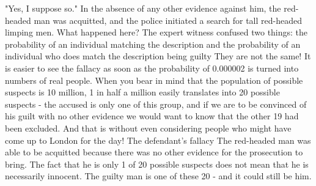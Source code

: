 "Yes, I suppose so."
In the absence of any other evidence against him, the red-headed man was acquitted, and the police initiated a search for tall red-headed limping men.
What happened here?
The expert witness confused two things:
the probability of an individual matching the description
and the probability of an individual who does match the description being guilty
They are not the same!
It is easier to see the fallacy as soon as the probability of 0.000002 is turned into numbers of real people. When you bear in mind that the population of possible suspects is 10 million, 1 in half a million easily translates into 20 possible suspects - the accused is only one of this group, and if we are to be convinced of his guilt with no other evidence we would want to know that the other 19 had been excluded.
And that is without even considering people who might have come up to London for the day!
The defendant's fallacy
The red-headed man was able to be acquitted because there was no other evidence for the prosecution to bring. The fact that he is only 1 of 20 possible suspects does not mean that he is necessarily innocent. The guilty man is one of these 20 - and it could still be him.


